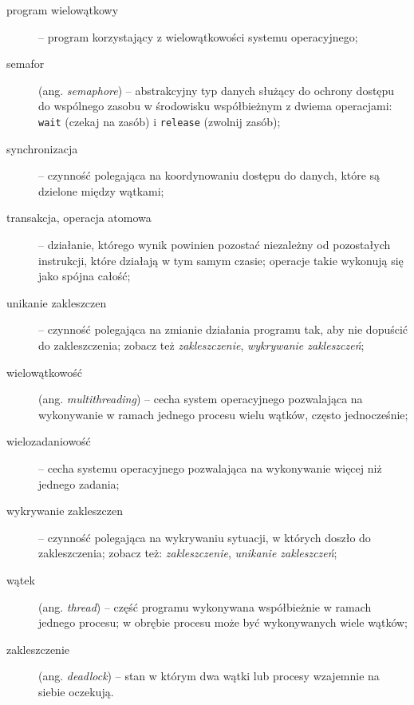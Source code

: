 \documentclass{documentation}
\begin{document}
\begin{description}
    \item[program wielowątkowy] -- program korzystający z wielowątkowości
    systemu operacyjnego;\\

    \item[semafor] (ang. \emph{semaphore}) -- abstrakcyjny typ danych służący
    do ochrony dostępu do wspólnego zasobu w środowisku współbieżnym z dwiema
        operacjami: \texttt{wait} (czekaj na zasób) i \texttt{release} (zwolnij
        zasób);\\

    \item[synchronizacja] -- czynność polegająca na koordynowaniu dostępu do
    danych, które są dzielone między wątkami;\\

\newpage
    \item[transakcja, operacja atomowa] -- działanie, którego wynik powinien
    pozostać niezależny od pozostałych instrukcji, które działają w tym samym
    czasie; operacje takie wykonują się jako spójna całość; \\

    \item[unikanie zakleszczen] -- czynność polegająca na zmianie działania
    programu tak, aby nie dopuścić do zakleszczenia; zobacz też
    \emph{zakleszczenie}, \emph{wykrywanie zakleszczeń};\\

    \item[wielowątkowość] (ang. \emph{multithreading}) -- cecha system
    operacyjnego pozwalająca na wykonywanie w ramach jednego procesu wielu
    wątków, często jednocześnie;\\

    \item[wielozadaniowość] -- cecha systemu operacyjnego pozwalająca na
    wykonywanie więcej niż jednego zadania;\\

    \item[wykrywanie zakleszczen] -- czynność polegająca na wykrywaniu
    sytuacji, w których doszło do zakleszczenia; zobacz też:
    \emph{zakleszczenie}, \emph{unikanie zakleszczeń};\\

    \item[wątek] (ang. \emph{thread}) -- część programu wykonywana współbieżnie
    w ramach jednego procesu; w obrębie procesu może być wykonywanych wiele
    wątków;\\

    \item[zakleszczenie] (ang. \emph{deadlock}) -- stan w którym dwa wątki lub
    procesy wzajemnie na siebie oczekują.\\

\end{description}
\end{document}
